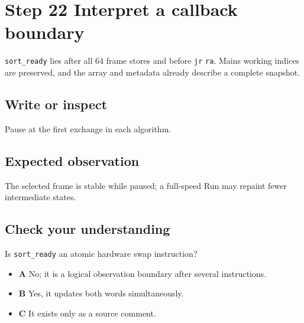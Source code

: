 \section{Step 22 Interpret a callback
  boundary}\label{009-sorting-visualizer-s22-step-22-interpret-a-callback-boundary}

\texttt{sort\_ready} lies after all 64 frame stores and before
\texttt{jr} \texttt{ra}. Main\textquotesingle s working indices are
preserved, and the array and metadata already describe a complete
snapshot.

\subsection{Write or
  inspect}\label{009-sorting-visualizer-s22-write-or-inspect}

Pause at the first exchange in each algorithm.

\subsection{Expected
  observation}\label{009-sorting-visualizer-s22-expected-observation}

The selected frame is stable while paused; a full-speed Run may repaint
fewer intermediate states.

\subsection{Check your
  understanding}\label{009-sorting-visualizer-s22-check-your-understanding}

Is \texttt{sort\_ready} an atomic hardware swap instruction?

\begin{itemize}
  \tightlist
  \item
        \textbf{A} No; it is a logical observation boundary after several
        instructions.
  \item
        \textbf{B} Yes, it updates both words simultaneously.
  \item
        \textbf{C} It exists only as a source comment.
\end{itemize}
